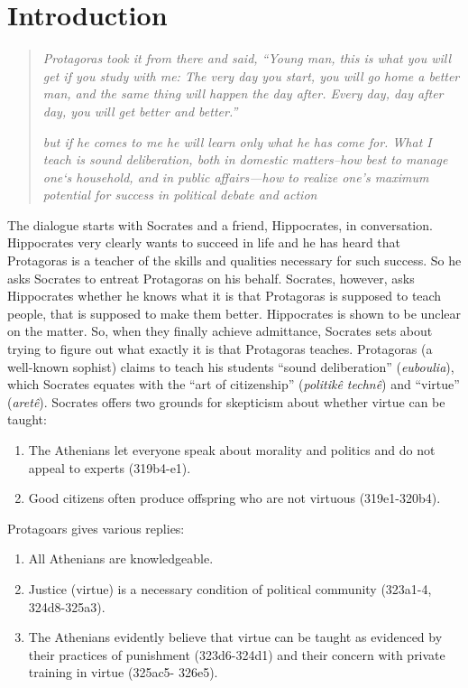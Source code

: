 \documentclass[oneside]{article}
\begin{document}
\section*{Introduction}

\begin{quote}
\emph{Protagoras took it from there and said, ``Young man, this is what you will get if you study with me: The very day you start, you will go home a better man, and the same thing will happen the day after. Every day, day after day, you will get better and better.''}

\emph{but if he comes to me he will learn only what he has come for. What I teach is sound deliberation, both in domestic matters--how best to manage one`s household, and in public affairs---how to realize one's maximum potential for success in political debate and action}
\end{quote}

\noindent The dialogue starts with Socrates and a friend, Hippocrates, in conversation. Hippocrates very clearly wants to succeed in life and he has heard that Protagoras is a teacher of the skills and qualities necessary for such success. So he asks Socrates to entreat Protagoras on his behalf. Socrates, however, asks Hippocrates whether he knows what it is that Protagoras is supposed to teach people, that is supposed to make them better. Hippocrates is shown to be unclear on the matter. So, when they finally achieve admittance, Socrates sets about trying to figure out what exactly it is that Protagoras teaches. Protagoras (a well-known sophist) claims to teach his students ``sound deliberation'' (\emph{euboulia}), which Socrates equates with the ``art of citizenship'' (\emph{politik\^{e} techn\^{e}}) and ``virtue'' (\emph{aret\^{e}}).  Socrates offers two grounds for skepticism about whether virtue can be taught:
\begin{enumerate}
\item The Athenians let everyone speak about morality and politics and do not appeal to experts (319b4-e1).
\item Good citizens often produce offspring who are not virtuous (319e1-320b4).
\end{enumerate}
\vspace*{2mm}
Protagoars gives various replies: 
\begin{enumerate} 
\item All Athenians are knowledgeable.
\item Justice (virtue) is a necessary condition of political community (323a1-4, 324d8-325a3).
\item The Athenians evidently believe that virtue can be taught as evidenced by their practices of
punishment (323d6-324d1) and their concern with private training in virtue (325ac5- 326e5).
\end{enumerate}
\end{document}
